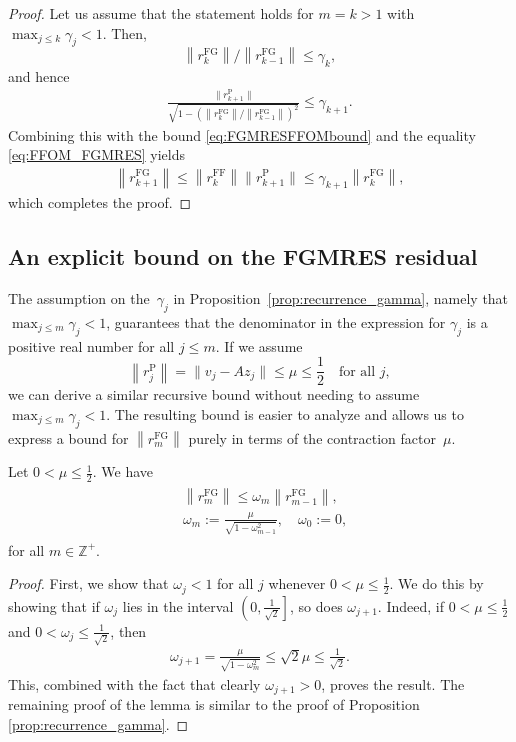 \documentclass{siamart251216}
\def\Z{\mathbb{Z}}
\begin{document}
{\begin{proof}
    Let us assume that the statement holds for $m = k > 1$ with $\max_{j \leq k} \gamma_j < 1$. Then, $$\left\|r_k^{\mathrm{FG}}\right\| / \left\|r_{k-1}^{\mathrm{FG}}\right\| \leq \gamma_k,$$
    and hence
    \begin{align*}
        \frac{\|r_{k+1}^{\mathrm{P}}\|}{\sqrt{1-(\left\|r_k^{\mathrm{FG}}\right\| / \left\|r_{k-1}^{\mathrm{FG}}\right\|)^2}} \leq \gamma_{k+1}.
    \end{align*}
    Combining this with the bound \eqref{eq:FGMRESFFOMbound} and the equality \eqref{eq:FFOM_FGMRES} yields
    \begin{align*}
        \left\|r_{k+1}^{\mathrm{FG}}\right\| \leq \left\|r_k^{\mathrm{FF}}\right\|\|r_{k+1}^{\mathrm{P}}\| \leq \gamma_{k+1} \left\|r_k^{\mathrm{FG}}\right\|,
    \end{align*}
    which completes the proof.
\end{proof}

\subsection{An explicit bound on the FGMRES residual}
The assumption on the~$\gamma_j$ in Proposition~\ref{prop:recurrence_gamma}, namely that $\max_{j \leq m} \gamma_{j} < 1$, guarantees that the denominator in the expression for $\gamma_{j}$ is a positive real number for all $j \leq m$. If we assume 
\[
\left\|r_j^{\mathrm{P}}\right\| = \| v_j - A z_j \| \leq \mu \leq \frac{1}{2} \quad \text{for all $j$},
\]
we can derive a similar recursive bound without needing to assume $\max_{j \leq m} \gamma_{j} < 1$. The resulting bound is easier to analyze and allows us to express a bound for $\left\|r_m^{\mathrm{FG}}\right\|$ purely in terms of the contraction factor~$\mu$.
\begin{lemma} \label{prop:recurrence}
    Let $0 < \mu \leq \frac{1}{2}.$ We have 
    \begin{align}
        \begin{aligned} \label{eq:successive_rG}
             & \left\|r_m^{\mathrm{FG}}\right\| \leq \omega_m \left\|r_{m-1}^{\mathrm{FG}}\right\|, \\
             & \omega_m := \frac{\mu}{\sqrt{1-\omega_{m-1}^2}}, \quad \omega_0 := 0,
        \end{aligned}
    \end{align}
    for all $m \in \Z^+$. 
\end{lemma}
\begin{proof}
    First, we show that $\omega_{j} < 1$ for all $j$ whenever $0 < \mu \leq \frac{1}{2}.$ We do this by showing that if $\omega_j$ lies in the interval $\left(0, \frac{1}{\sqrt{2}}\right]$, so does $\omega_{j+1}$. Indeed, if $0 < \mu \leq \frac{1}{2}$ and $0 < \omega_{j} \leq \frac{1}{\sqrt{2}}$, then
    \begin{align*}
       \omega_{j+1} = \frac{\mu}{\sqrt{1-\omega_{m}^2}} \leq \sqrt{2} \mu \leq \frac{1}{\sqrt{2}}.
    \end{align*}
    This, combined with the fact that clearly $\omega_{j+1} > 0$, proves the result. The remaining proof of the lemma is similar to the proof of Proposition \ref{prop:recurrence_gamma}.
\end{proof}

}
\end{document}
